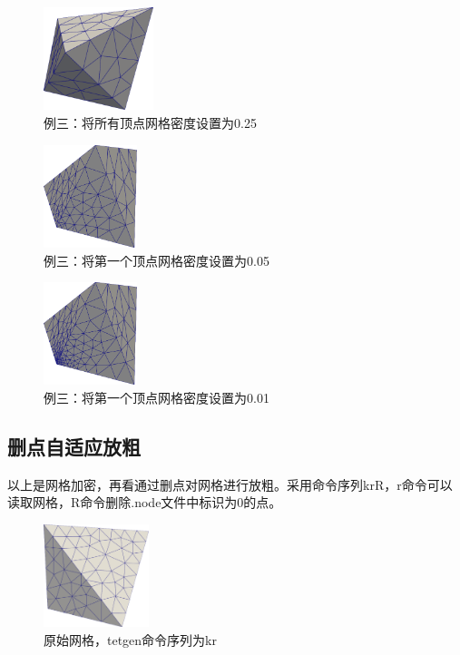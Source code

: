 \begin{figure}[!htbp]
  \centering
  \includegraphics[height=3cm]{fig/2/13.png}
  \caption{例三：将所有顶点网格密度设置为0.25}
  \label{fig:2-1}
\end{figure}

\begin{figure}[!htbp]
  \centering
  \includegraphics[height=3cm]{fig/2/14.png}
  \caption{例三：将第一个顶点网格密度设置为0.05}
  \label{fig:2-1}
\end{figure}

\begin{figure}[!htbp]
  \centering
  \includegraphics[height=3cm]{fig/2/15.png}
  \caption{例三：将第一个顶点网格密度设置为0.01}
  \label{fig:2-1}
\end{figure}

\subsection{删点自适应放粗}

以上是网格加密，再看通过删点对网格进行放粗。采用命令序列krR，r命令可以读取网格，R命令删除.node文件中标识为0的点。
\begin{figure}[!htbp]
  \centering
  \includegraphics[height=3cm]{fig/2/18.png}
  \caption{原始网格，tetgen命令序列为kr}
  \label{fig:2-1}
\end{figure}

